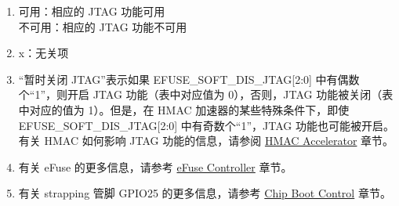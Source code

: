 \begin{tiplisting}
\vspace{-2em}
\begin{enumerate}
\item \label{JTAG footnote: 1}
    可用：相应的 JTAG 功能可用\\
    不可用：相应的 JTAG 功能不可用
\item \label{JTAG footnote: 2}
    x：无关项
\item \label{JTAG footnote: 3}
    “暂时关闭 JTAG”表示如果 EFUSE\_SOFT\_DIS\_JTAG[2:0] 中有偶数个“1”，则开启 JTAG 功能（表中对应值为 0），否则，JTAG 功能被关闭（表中对应的值为 1）。但是，在\chipname{} HMAC 加速器的某些特殊条件下，即使 EFUSE\_SOFT\_DIS\_JTAG[2:0] 中有奇数个“1”，JTAG 功能也可能被开启。
    有关 HMAC 如何影响 JTAG 功能的信息，请参阅 \hyperref[mod:hmac]{HMAC Accelerator} 章节。
\item \label{JTAG footnote: 4}
    有关 eFuse 的更多信息，请参考 \hyperref[mod:efuse]{eFuse Controller} 章节。
\item \label{JTAG footnote: 5}
    有关 strapping 管脚 GPIO25 的更多信息，请参考 \hyperref[mod:bootctrl]{Chip Boot Control} 章节。
\end{enumerate}
\end{tiplisting}